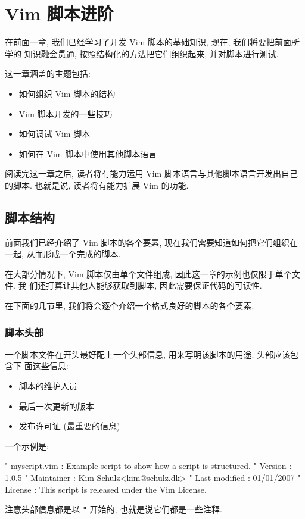 \chapter{Vim 脚本进阶}
\label{chap:extended_vim_scripting}

在前面一章, 我们已经学习了开发 Vim 脚本的基础知识, 现在, 我们将要把前面所学的
知识融会贯通, 按照结构化的方法把它们组织起来, 并对脚本进行测试.

这一章涵盖的主题包括:
\begin{itemize}
    \item 如何组织 Vim 脚本的结构
    \item Vim 脚本开发的一些技巧
    \item 如何调试 Vim 脚本
    \item 如何在 Vim 脚本中使用其他脚本语言
\end{itemize}

阅读完这一章之后, 读者将有能力运用 Vim 脚本语言与其他脚本语言开发出自己的脚本.
也就是说, 读者将有能力扩展 Vim 的功能.

\section{脚本结构}
\label{sec:script_structure}

前面我们已经介绍了 Vim 脚本的各个要素, 现在我们需要知道如何把它们组织在一起,
从而形成一个完成的脚本.

在大部分情况下, Vim 脚本仅由单个文件组成, 因此这一章的示例也仅限于单个文件. 我
们还打算让其他人能够获取到脚本, 因此需要保证代码的可读性.

在下面的几节里, 我们将会逐个介绍一个格式良好的脚本的各个要素.

\subsection{脚本头部}
\label{subsec:script_header}

一个脚本文件在开头最好配上一个头部信息, 用来写明该脚本的用途. 头部应该包含下
面这些信息:
\begin{itemize}
    \item 脚本的维护人员
    \item 最后一次更新的版本
    \item 发布许可证 (最重要的信息)
\end{itemize}
一个示例是:
\begin{vimcode}
" myscript.vim  : Example script to show how a script is structured.
" Version       : 1.0.5
" Maintainer    : Kim Schulz<kim@schulz.dk>
" Last modified : 01/01/2007
" License       : This script is released under the Vim License.
\end{vimcode}
注意头部信息都是以 \texttt{"} 开始的, 也就是说它们都是一些注释.

